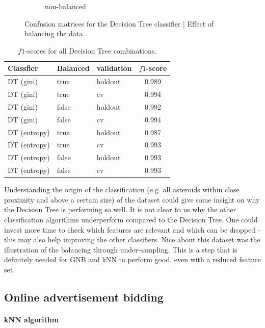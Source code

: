 \documentclass{article}
\begin{document}
\begin{figure}[h!]
\begin{subfigure}{.5\textwidth}
		\caption{non-balanced}
	\end{subfigure}
	\caption{Confusion matrices for the Decision Tree classifier | Effect of balancing the data.}
	\label{fig:conf_matr_asteroids_bal_vs_nonbal}
\end{figure}

\begin{table}[h!]
		\centering
    \begin{tabular}{ l l l c }
        \toprule
        \textbf{Classfier} & \textbf{Balanced} & \textbf{validation} & \textbf{$f1$-score} \\
        \toprule
        DT (gini) & true & holdout & 0.989 \\
				DT (gini) & true & cv & 0.994 \\
        DT (gini) & false & holdout & 0.992 \\
				DT (gini) & false & cv & 0.994 \\
				DT (entropy) & true & holdout & 0.987 \\
				DT (entropy) & true & cv & 0.993 \\
				DT (entropy) & false & holdout & 0.993 \\
        DT (entropy) & false & cv & 0.993 \\
        \bottomrule
    \end{tabular}
		\caption{$f1$-scores for all Decision Tree combinations.}
		\label{tab:dec_tree_perf_ast}
\end{table}

\noindent Understanding the origin of the classification (e.g. all asteroids within close proximity and above a certain size) of the dataset could give some insight on why the Decision Tree is performing so well. It is not clear to us why the other classification algorithms underperform compared to the Decision Tree. One could invest more time to check which features are relevant and which can be dropped - this may also help improving the other classifiers. Nice about this dataset was the illustration of the balancing through under-sampling. This is a step that is definitely needed for GNB and kNN to perform good, even with a reduced feature set.


\subsection{Online advertisement bidding}

\paragraph{kNN algorithm }
\end{document}
